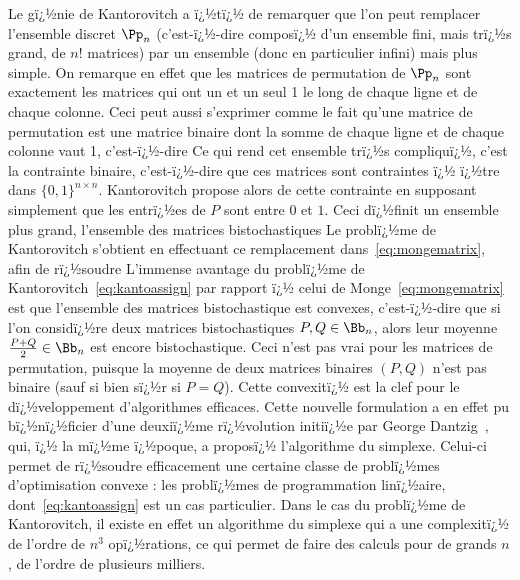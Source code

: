 Le gï¿½nie de Kantorovitch a ï¿½tï¿½ de remarquer que l'on peut remplacer l'ensemble discret $\Pp_n$ (c'est-ï¿½-dire composï¿½ d'un ensemble fini, mais trï¿½s grand, de $n!$ matrices) par un ensemble  (donc en particulier infini) mais plus simple. On remarque en effet que les matrices de permutation de $\Pp_n$ sont exactement les matrices qui ont un et un seul 1 le long de chaque ligne et de chaque colonne. Ceci peut aussi s'exprimer comme le fait qu'une matrice de permutation est une matrice binaire dont la somme de chaque ligne et de chaque colonne vaut 1, c'est-ï¿½-dire
Ce qui rend cet ensemble trï¿½s compliquï¿½, c'est la contrainte binaire, c'est-ï¿½-dire que ces matrices sont contraintes ï¿½ ï¿½tre dans $\{0,1\}^{n \times n}$. Kantorovitch propose alors de  cette contrainte en supposant simplement que les entrï¿½es de $P$ sont entre $0$ et $1$. Ceci dï¿½finit un ensemble plus grand, l'ensemble des matrices bistochastiques 
Le problï¿½me de Kantorovitch s'obtient en effectuant ce remplacement dans~\eqref{eq:mongematrix}, afin de rï¿½soudre 
L'immense avantage du problï¿½me de Kantorovitch~\eqref{eq:kantoassign} par rapport ï¿½ celui de Monge~\eqref{eq:mongematrix} est que l'ensemble des matrices bistochastique est convexes, c'est-ï¿½-dire que si l'on considï¿½re deux matrices bistochastiques $P,Q \in \Bb_n$, alors leur moyenne $\frac{P+Q}{2} \in \Bb_n$ est encore bistochastique. Ceci n'est pas vrai pour les matrices de permutation, puisque la moyenne de deux matrices binaires $(P,Q)$ n'est pas binaire (sauf si bien sï¿½r si $P=Q$). Cette convexitï¿½ est la clef pour le dï¿½veloppement d'algorithmes efficaces. 
%
Cette nouvelle formulation a en effet pu bï¿½nï¿½ficier d'une deuxiï¿½me rï¿½volution initiï¿½e par George Dantzig~\cite{Dantzig51}, qui, ï¿½ la mï¿½me ï¿½poque, a proposï¿½ l'algorithme du simplexe. Celui-ci permet de rï¿½soudre efficacement une certaine classe de problï¿½mes d'optimisation convexe : les problï¿½mes de programmation linï¿½aire, dont~\eqref{eq:kantoassign} est un cas particulier. Dans le cas du problï¿½me de Kantorovitch, il existe en effet un algorithme du simplexe qui a une complexitï¿½ de l'ordre de $n^3$ opï¿½rations, ce qui permet de faire des calculs pour de grands $n$, de l'ordre de plusieurs milliers. 


